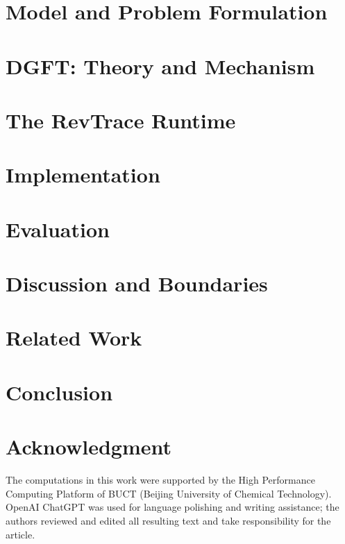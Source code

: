\documentclass[journal,10pt]{IEEEtran}
\theoremstyle{remark}
\begin{document}
\section{Model and Problem Formulation}\label{sec:model}


\section{DGFT: Theory and Mechanism}\label{sec:dgft}


\section{The RevTrace Runtime}\label{sec:system}


\section{Implementation}\label{sec:impl}


\section{Evaluation}\label{sec:eval}


\section{Discussion and Boundaries}\label{sec:discussion}


\section{Related Work}\label{sec:related}


\section{Conclusion}\label{sec:conclusion}


\section*{Acknowledgment}
The computations in this work were supported by the High Performance
Computing Platform of BUCT (Beijing University of Chemical Technology).
OpenAI ChatGPT was used for language polishing and writing assistance; the
authors reviewed and edited all resulting text and take responsibility for the
article.



\end{document}
